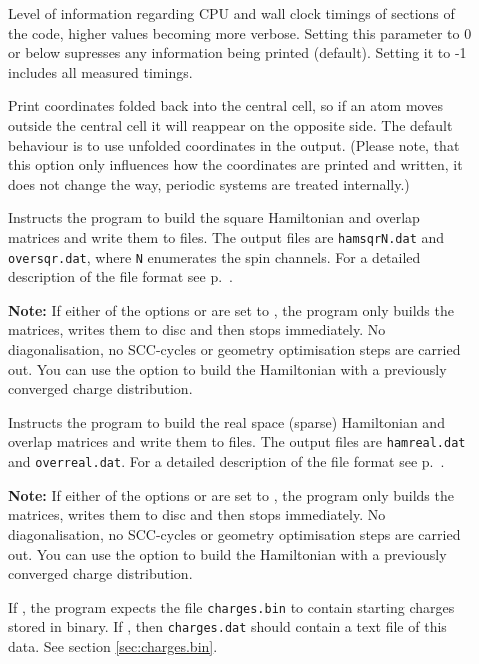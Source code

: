 \begin{description}
\item[] Level of information regarding CPU and wall clock
  timings of sections of the code, higher values becoming more verbose. Setting
  this parameter to 0 or below supresses any information being printed
  (default). Setting it to -1 includes all measured timings.

\item[] Print coordinates folded back into the
  central cell, so if an atom moves outside the central cell it will
  reappear on the opposite side. The default behaviour is to use
  unfolded coordinates in the output. (Please note, that this option
  only influences how the coordinates are printed and written, it does
  not change the way, periodic systems are treated internally.)

\item[] Instructs the program to build the square
  Hamiltonian and overlap matrices and write them to files. The output
  files are \verb|hamsqrN.dat| and \verb|oversqr.dat|, where \verb|N|
  enumerates the spin channels. For a detailed description of the file
  format see p.~.

  \textbf{Note:} If either of the options  or  are
  set to , the program only builds the matrices, writes them to disc and
  then stops immediately. No diagonalisation, no SCC-cycles or geometry
  optimisation steps are carried out. You can use the 
  option to build the Hamiltonian with a previously converged charge
  distribution.

\item[] Instructs the program to build the real space
  (sparse) Hamiltonian and overlap matrices and write them to
  files. The output files are \verb|hamreal.dat| and
  \verb|overreal.dat|. For a detailed description of the file format
  see p.~.

  \textbf{Note:} If either of the options  or  are
  set to , the program only builds the matrices, writes them to disc and
  then stops immediately. No diagonalisation, no SCC-cycles or geometry
  optimisation steps are carried out. You can use the 
  option to build the Hamiltonian with a previously converged charge
  distribution.

\item[] If , the program expects the file
  \verb|charges.bin| to contain starting charges stored in binary. If ,
  then \verb|charges.dat| should contain a text file of this data. See section
  \ref{sec:charges.bin}.


\end{description}
